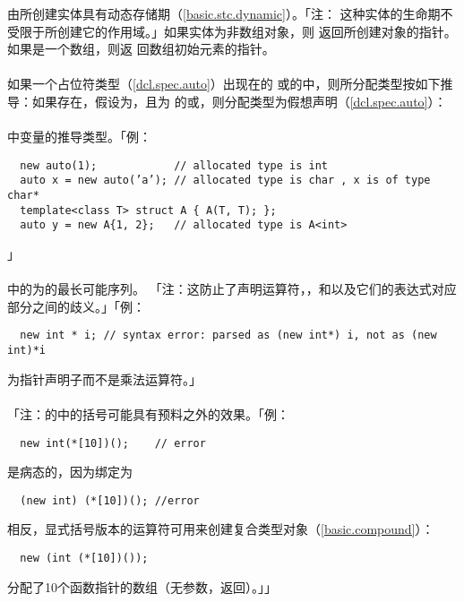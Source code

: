 由所创建实体具有动态存储期（\ref{basic.stc.dynamic}）。「注：
这种实体的生命期不受限于所创建它的作用域。」如果实体为非数组对象，则
返回所创建对象的指针。如果是一个数组，则返
回数组初始元素的指针。

\paragraph{}
如果一个占位符类型（\ref{dcl.spec.auto}）出现在的
或的中，则所分配类型按如下推
导：如果存在，假设为，且为
的或，则分配类型为假想声明（\ref{dcl.spec.auto}）：\\
\mbox{\qquad {}  \tm{;}} \\
中变量的推导类型。「例：
\begin{lstlisting}
  new auto(1);            // allocated type is int
  auto x = new auto(’a’); // allocated type is char , x is of type char*
  template<class T> struct A { A(T, T); };
  auto y = new A{1, 2};   // allocated type is A<int>
\end{lstlisting}」

\paragraph{}
中的为的最长可能序列。
「注：这防止了声明运算符\tm{\&}，\tm{\&\&}，\tm{*}和\tm{[]}以及它们的表达式对应
部分之间的歧义。」「例：
\begin{lstlisting}
  new int * i; // syntax error: parsed as (new int*) i, not as (new int)*i
\end{lstlisting}
\tm{*}为指针声明子而不是乘法运算符。」

\paragraph{}
「注：的中的括号可能具有预料之外的效果。「例：
\begin{lstlisting}
  new int(*[10])();    // error
\end{lstlisting}
是病态的，因为绑定为
\begin{lstlisting}
  (new int) (*[10])(); //error
\end{lstlisting}
相反，显式括号版本的运算符可用来创建复合类型对象（\ref{basic.compound}）：
\begin{lstlisting}
  new (int (*[10])());
\end{lstlisting}
分配了10个函数指针的数组（无参数，返回）。」」


